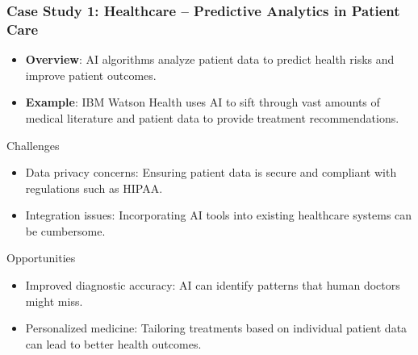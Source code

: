 \documentclass{beamer}
\begin{document}
\begin{frame}[fragile]
    \frametitle{Case Study 1: Healthcare – Predictive Analytics in Patient Care}
    \begin{itemize}
        \item \textbf{Overview}: AI algorithms analyze patient data to predict health risks and improve patient outcomes.
        \item \textbf{Example}: IBM Watson Health uses AI to sift through vast amounts of medical literature and patient data to provide treatment recommendations.
    \end{itemize}

    \begin{block}{Challenges}
        \begin{itemize}
            \item Data privacy concerns: Ensuring patient data is secure and compliant with regulations such as HIPAA.
            \item Integration issues: Incorporating AI tools into existing healthcare systems can be cumbersome.
        \end{itemize}
    \end{block}

    \begin{block}{Opportunities}
        \begin{itemize}
            \item Improved diagnostic accuracy: AI can identify patterns that human doctors might miss.
            \item Personalized medicine: Tailoring treatments based on individual patient data can lead to better health outcomes.
        \end{itemize}
    \end{block}
\end{frame}
\end{document}
